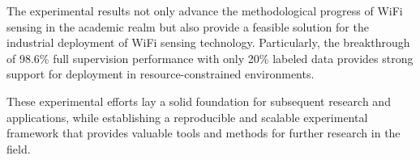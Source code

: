 The experimental results not only advance the methodological progress of WiFi sensing in the academic realm but also provide a feasible solution for the industrial deployment of WiFi sensing technology. Particularly, the breakthrough of 98.6\% full supervision performance with only 20\% labeled data provides strong support for deployment in resource-constrained environments.

These experimental efforts lay a solid foundation for subsequent research and applications, while establishing a reproducible and scalable experimental framework that provides valuable tools and methods for further research in the field.
